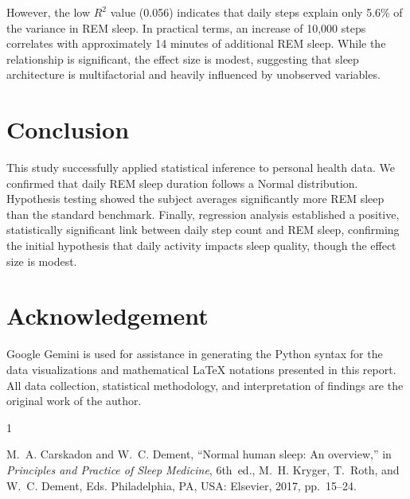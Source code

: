 \documentclass[conference]{IEEEtran}
\begin{document}
However, the low $R^2$ value (0.056) indicates that daily steps explain only 5.6\% of the variance in REM sleep. In practical terms, an increase of 10,000 steps correlates with approximately 14 minutes of additional REM sleep. While the relationship is significant, the effect size is modest, suggesting that sleep architecture is multifactorial and heavily influenced by unobserved variables. 

\section{Conclusion}
This study successfully applied statistical inference to personal health data. We confirmed that daily REM sleep duration follows a Normal distribution. Hypothesis testing showed the subject averages significantly more REM sleep than the standard benchmark. Finally, regression analysis established a positive, statistically significant link between daily step count and REM sleep, confirming the initial hypothesis that daily activity impacts sleep quality, though the effect size is modest.

\section*{Acknowledgement}
Google Gemini is used for assistance in generating the Python syntax for the data visualizations and mathematical LaTeX notations presented in this report. All data collection, statistical methodology, and interpretation of findings are the original work of the author.

\begin{thebibliography}{1}

M.~A. Carskadon and W.~C. Dement,
``Normal human sleep: An overview,''
in \emph{Principles and Practice of Sleep Medicine},
6th~ed., M.~H. Kryger, T.~Roth, and W.~C. Dement, Eds.
Philadelphia, PA, USA: Elsevier, 2017, pp.~15--24.

\end{thebibliography}

% 
\end{document}
